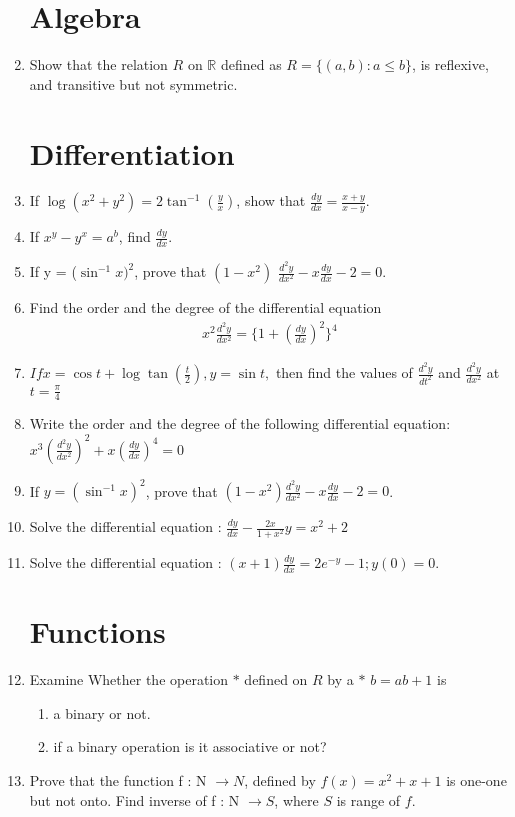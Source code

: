 \documentclass{article}
\begin{document}
\begin{enumerate}
\section{Algebra}
\item Show that the relation $R$ on $\mathbb{R}$ defined as $R = \{(a, b) : a \leq b\}$, is reflexive, and transitive but not symmetric.
\section{Differentiation}
\item If $\log(x^2+y^2)=2 \tan^{-1} (\frac{y}{x})$, show that $\frac{dy}{dx}=\frac{x+y}{x-y}$.
\item If ${x^y-y^x}=a^b$, find $\frac{dy}{dx}$.
\item If y = ($\sin^{-1}x)^2$, prove that $(1-x^2)$ $\frac{d^2y}{dx^2}-x\frac{dy}{dx}-2=0$.
\item Find the order and the degree of the differential equation
\begin{align*}
x^{2}\frac{d^{2}y}{dx^{2}}=\{1+(\frac{dy}{dx})^{2}\}^{4}
\end{align*}
\item $If x = \cos t + \log \tan(\frac{t}{2}),y=\sin t, $ then find the values of $\frac{d^2y}{dt^2}$ and $\frac{d^2y}{dx^2}$ at $t= \frac{\pi}{4}$
\item Write the order and the degree of the following differential equation: $x^3(\frac{d^2y}{dx^2})^2 +x(\frac{dy}{dx})^4 = 0 $
\item If $y=(\sin^{-1}x)^2$, prove that $(1-x^2)\frac{d^2y}{dx^2}-x \frac{dy}{dx}-2=0$.
\item Solve the differential equation : $\frac{dy}{dx} - \frac{2x}{1+x^2}y = x^2 + 2$
\item Solve the differential equation : $(x+1)\frac{dy}{dx} =2e^{-y}-1;y(0)=0$.
\section{Functions}
\item Examine Whether the operation $*$ defined on $R$ by a $*$ $b = ab+1$ is
\begin{enumerate}
    \item a binary or not.
    \item if a binary operation is it associative or not?
\end{enumerate}
\item Prove that the function f : N $\xrightarrow{} N$, defined by $f(x) = {x^2}+x+1$  is one-one but not onto. Find inverse of f : N $\xrightarrow{} S$, where $S$ is range of $f$.

\end{enumerate}
\end{document}
